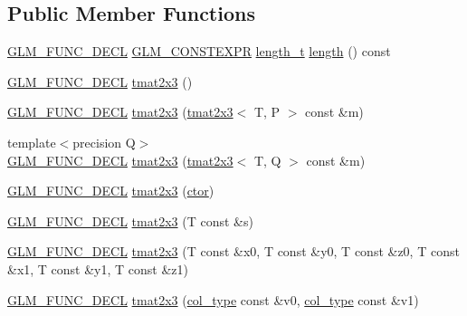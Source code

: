 \subsection*{Public Member Functions}
\begin{DoxyCompactItemize}
\item 
\hyperlink{setup_8hpp_ab2d052de21a70539923e9bcbf6e83a51}{G\+L\+M\+\_\+\+F\+U\+N\+C\+\_\+\+D\+E\+CL} \hyperlink{setup_8hpp_a08b807947b47031d3a511f03f89645ad}{G\+L\+M\+\_\+\+C\+O\+N\+S\+T\+E\+X\+PR} \hyperlink{namespaceglm_a090a0de2260835bee80e71a702492ed9}{length\+\_\+t} \hyperlink{structglm_1_1detail_1_1tmat2x3_aaa2e4b8a6d400cebc4f6a4fb4e2542d8}{length} () const
\item 
\hyperlink{setup_8hpp_ab2d052de21a70539923e9bcbf6e83a51}{G\+L\+M\+\_\+\+F\+U\+N\+C\+\_\+\+D\+E\+CL} \hyperlink{structglm_1_1detail_1_1tmat2x3_a5f05d4dddbc1d6fbaf485c5ea2440117}{tmat2x3} ()
\item 
\hyperlink{setup_8hpp_ab2d052de21a70539923e9bcbf6e83a51}{G\+L\+M\+\_\+\+F\+U\+N\+C\+\_\+\+D\+E\+CL} \hyperlink{structglm_1_1detail_1_1tmat2x3_a4d7107015eb343a44948415ecd5c8402}{tmat2x3} (\hyperlink{structglm_1_1detail_1_1tmat2x3}{tmat2x3}$<$ T, P $>$ const \&m)
\item 
{\footnotesize template$<$precision Q$>$ }\\\hyperlink{setup_8hpp_ab2d052de21a70539923e9bcbf6e83a51}{G\+L\+M\+\_\+\+F\+U\+N\+C\+\_\+\+D\+E\+CL} \hyperlink{structglm_1_1detail_1_1tmat2x3_a7fbd232bac090da9a982bd7071d0492b}{tmat2x3} (\hyperlink{structglm_1_1detail_1_1tmat2x3}{tmat2x3}$<$ T, Q $>$ const \&m)
\item 
\hyperlink{setup_8hpp_ab2d052de21a70539923e9bcbf6e83a51}{G\+L\+M\+\_\+\+F\+U\+N\+C\+\_\+\+D\+E\+CL} \hyperlink{structglm_1_1detail_1_1tmat2x3_ab7acd9cede9ab295cdd2ce31d19f7549}{tmat2x3} (\hyperlink{structglm_1_1detail_1_1tmat2x3_ad7092896f5d4dad36473ed142687f571}{ctor})
\item 
\hyperlink{setup_8hpp_ab2d052de21a70539923e9bcbf6e83a51}{G\+L\+M\+\_\+\+F\+U\+N\+C\+\_\+\+D\+E\+CL} \hyperlink{structglm_1_1detail_1_1tmat2x3_aee77b4e0eece78d68bf0ae3a95c520a3}{tmat2x3} (T const \&s)
\item 
\hyperlink{setup_8hpp_ab2d052de21a70539923e9bcbf6e83a51}{G\+L\+M\+\_\+\+F\+U\+N\+C\+\_\+\+D\+E\+CL} \hyperlink{structglm_1_1detail_1_1tmat2x3_a6e7924d5ec396e17f9029f69597a7815}{tmat2x3} (T const \&x0, T const \&y0, T const \&z0, T const \&x1, T const \&y1, T const \&z1)
\item 
\hyperlink{setup_8hpp_ab2d052de21a70539923e9bcbf6e83a51}{G\+L\+M\+\_\+\+F\+U\+N\+C\+\_\+\+D\+E\+CL} \hyperlink{structglm_1_1detail_1_1tmat2x3_ad26d0797d1a4ef0117dfd412dde991ea}{tmat2x3} (\hyperlink{structglm_1_1detail_1_1tmat2x3_aa68634b0c048f0010844a45aa5e9bdab}{col\+\_\+type} const \&v0, \hyperlink{structglm_1_1detail_1_1tmat2x3_aa68634b0c048f0010844a45aa5e9bdab}{col\+\_\+type} const \&v1)

\end{DoxyCompactItemize}
